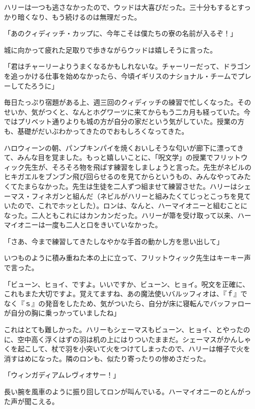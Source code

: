 \documentclass[10pt,a4paper]{article}
\begin{document}
\begin{CJK}{UTF8}{min}
ハリーは一つも逃さなかったので、ウッドは大喜びだった。三十分もするとすっかり暗くなり、もう続けるのは無理だった。

「あのクィディッチ・カップに、今年こそは僕たちの寮の名前が入るぞ！」

城に向かって疲れた足取りで歩きながらウッドは嬉しそうに言った。

「君はチャーリーよりうまくなるかもしれないな。チャーリーだって、ドラゴンを追っかける仕事を始めなかったら、今頃イギリスのナショナル・チームでプレーしてたろうに」



毎日たっぷり宿題がある上、週三回のクィディッチの練習で忙しくなった。そのせいか、気がつくと、なんとホグワーツに来てからもう二カ月も経っていた。今ではプリベット通りよりも城の方が自分の家だという気がしていた。授業の方も、基礎がだいぶわかってきたのでおもしろくなってきた。

ハロウィーンの朝、パンプキンパイを焼くおいしそうな匂いが廊下に漂ってきて、みんな目を覚ました。もっと嬉しいことに、「呪文学」の授業でフリットウィック先生が、そろそろ物を飛ばす練習をしましょうと言った。先生がネビルのヒキガエルをブンブン飛び回らせるのを見てからというもの、みんなやってみたくてたまらなかった。先生は生徒を二人ずつ組ませて練習させた。ハリーはシェーマス・フィネガンと組んだ（ネビルがハリーと組みたくてじっとこっちを見ていたので、これでホッとした）。ロンは、なんと、ハーマイオニーと組むことになった。二人ともこれにはカンカンだった。ハリーが箒を受け取って以来、ハーマイオニーは一度も二人と口をきいていなかった。

「さあ、今まで練習してきたしなやかな手首の動かし方を思い出して」

いつものように積み重ねた本の上に立って、フリットウィック先生はキーキー声で言った。

「ビューン、ヒョイ、ですよ。いいですか、ビューン、ヒョイ。呪文を正確に、これもまた大切ですよ。覚えてますね、あの魔法使いバルッフィオは、『ｆ』でなく『ｓ』の発音をしたため、気がついたら、自分が床に寝転んでバッファローが自分の胸に乗っかっていましたね」

これはとても難しかった。ハリーもシェーマスもビューン、ヒョイ、とやったのに、空中高く浮くはずの羽は机の上にはりついたままだ。シェーマスがかんしゃくを起こして、杖で羽を小突いて火をつけてしまったので、ハリーは帽子で火を消すはめになった。隣のロンも、似たり寄ったりの惨めさだった。

「ウィンガディアムレヴィオサー！」

長い腕を風車のように振り回してロンが叫んでいる。ハーマイオニーのとんがった声が聞こえる。


\end{CJK}
\end{document}
